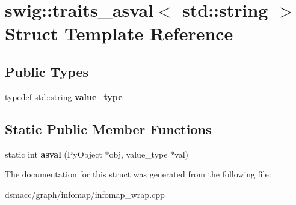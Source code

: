 \hypertarget{structswig_1_1traits__asval_3_01std_1_1string_01_4}{}\section{swig\+:\+:traits\+\_\+asval$<$ std\+:\+:string $>$ Struct Template Reference}
\label{structswig_1_1traits__asval_3_01std_1_1string_01_4}
\subsection*{Public Types}
\begin{DoxyCompactItemize}
\item 
\mbox{\label{structswig_1_1traits__asval_3_01std_1_1string_01_4_a66eab9ad087e2527eb509f04e6e70d75}} 
typedef std\+::string {\bfseries value\+\_\+type}
\end{DoxyCompactItemize}
\subsection*{Static Public Member Functions}
\begin{DoxyCompactItemize}
\item 
\mbox{\label{structswig_1_1traits__asval_3_01std_1_1string_01_4_a1b4d91079cc3870021fac8f5514404ff}} 
static int {\bfseries asval} (Py\+Object $\ast$obj, value\+\_\+type $\ast$val)
\end{DoxyCompactItemize}


The documentation for this struct was generated from the following file\+:\begin{DoxyCompactItemize}
\item 
dsmacc/graph/infomap/infomap\+\_\+wrap.\+cpp\end{DoxyCompactItemize}
